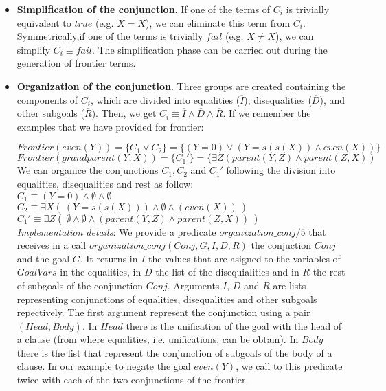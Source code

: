 \documentclass{tlp}
\begin{document}
\begin{itemize}

\item {\bf Simplification of the conjunction}. If one of the terms of
$C_i$ is trivially equivalent to $true$ (e.g. $X=X$), we can eliminate
this term from $C_i$. Symmetrically,if one of the terms is trivially
$fail$ (e.g. $X \neq X$), we can simplify $C_i \equiv fail$. The
simplification phase can be carried out during the generation of
frontier terms.

\item {\bf Organization of the conjunction}. Three groups are created
containing the components of $C_i$, which are divided into equalities
($\overline{I}$), disequalities ($\overline{D}$), and other subgoals
($\overline{R}$).  Then, we get $C_i \equiv \overline{I} \wedge
\overline{D} \wedge \overline{R}$. If we remember the examples that we have
provided for frontier:

$Frontier(even(Y)) = \{ C_1  \vee  C_2 \} = \{ ( Y=0 ) \vee ( Y=s(s(X)) \wedge
even(X) ) \}$ \\
$Frontier(grandparent(Y,X)) = \{ C_1'\} =   \{ \exists Z (parent(Y,Z) \wedge
parent(Z,X) )$ \\

We can organice the conjunctions $C_1, C_2$ and $C_1'$ following the division
into equalities, disequalities and rest as follow:\\
$C_1 \equiv ( Y=0 )  \wedge  \emptyset \wedge \emptyset$ \\
$C_2 \equiv  \exists X (~( Y=s(s(X)) ) \wedge \emptyset \wedge ( even(X) )~ )$ \\
$C_1' \equiv \exists Z (~ \emptyset \wedge \emptyset \wedge ( parent(Y,Z) \wedge
parent(Z,X)  ) ~)$ \\


\noindent
\emph{Implementation details}: We provide a predicate $organization\_conj/5$ 
that receives in a call $organization\_conj(Conj,G,I,D,R)$ the conjuction
$Conj$ and the goal $G$. It returns in $I$ the values that are asigned to the
variables of $GoalVars$ in the equalities, in $D$ the list of the
disequialities and in $R$ the rest of subgoals of the conjunction
$Conj$. Arguments $I$, $D$ and $R$ are lists representing conjunctions of
equalities, disequalities and other subgoals repectively. The first argument
represent the conjunction using a pair $(Head,Body)$. In $Head$ there is the
unification of the goal with the head of a clause (from where equalities, i.e.
unifications, can
be obtain). In $Body$ there is the list that represent the conjunction of
subgoals of the body of a clause. 
In our example to negate the  goal $even(Y)$, we call to this predicate twice with
each of the two conjunctions of the frontier. 


\end{itemize}
\end{document}
